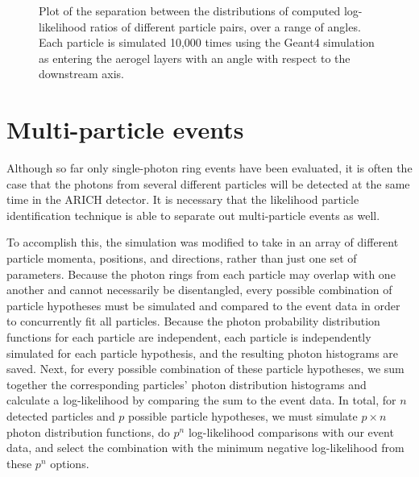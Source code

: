 \begin{figure}[]
\centering
{}
\caption[Plot of the separation between the distributions of computed log-likelihood ratios of different particle pairs, over a range of angles. ]{Plot of the separation between the distributions of computed log-likelihood ratios of different particle pairs, over a range of angles. Each particle is simulated 10,000 times using the Geant4 simulation as entering the aerogel layers with an angle with respect to the downstream axis. }\label{fig:angleSeps}
\end{figure}

\section{Multi-particle events}
\label{sec:multiparticle}
Although so far only single-photon ring events have been evaluated, it is often the case that the photons from several different particles will be detected at the same time in the ARICH detector.
It is necessary that the likelihood particle identification technique is able to separate out multi-particle events as well. 

To accomplish this, the simulation was modified to take in an array of different particle momenta, positions, and directions, rather than just one set of parameters.
Because the photon rings from each particle may overlap with one another and cannot necessarily be disentangled, every possible combination of particle hypotheses must be simulated and compared to the event data in order to concurrently fit all particles.
Because the photon probability distribution functions for each particle are independent, each particle is independently simulated for each particle hypothesis, and the resulting photon histograms are saved.
Next, for every possible combination of these particle hypotheses, we sum together the corresponding particles' photon distribution histograms and calculate a log-likelihood by comparing the sum to the event data.
In total, for $n$ detected particles and $p$ possible particle hypotheses, we must simulate $p \times n$ photon distribution functions, do $p^n$  log-likelihood comparisons with our event data, and select the combination with the minimum negative log-likelihood from these $p^n$ options. 

